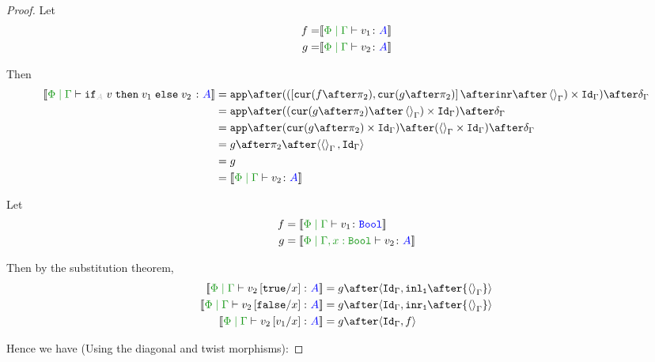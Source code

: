 \documentclass{report}
\begin{document}
\begin{framed}
\begin{proof}
        
        Let
        \begin{align*}
            f = &\deno{\gpetyperelation{v_1}{A}}\\
            g = &\deno{\gpetyperelation{v_2}{A}}\\
        \end{align*}
        
        Then
        \begin{equation}
            \begin{split}
                \deno{\gpetyperelation{\pifthenelse{A}{v}{v_1}{v_2}}{A}} & = \ifMorph{\inr\after\term{\G}}{f}{g} \\
                & = \app\after((\cur{g\after\pp}\after\term{\G})\times\idg)\after\diag{\G}\\
                & = \app\after(\cur{g\after\pp}\times\idg)\after(\term{\G}\times\idg)\after\diag{\G}\\
                & = g\after\pp\after\pr{\term{\G}}{\idg}\\
                & = g \\
                & = \deno{\gpetyperelation{v_2}{A}}\\
            \end{split}
        \end{equation}
        
            Let 
            \begin{align*}
                f & = \deno{\etyperelation{\P}{\G}{v_1}{\B}} \\
                g & = \deno{\etyperelation{\P}{\G, x: \B}{v_2}{A}} \\
            \end{align*}
        
        
            Then by the substitution theorem,
            \begin{align*}
                \deno{\etyperelation{\P}{\G}{v_2\ssub{x}{\t}}{A}} & = g\after\pr{\idg}{\inl_\1\after{\term{\G}}}\\
                \deno{\etyperelation{\P}{\G}{v_2\ssub{x}{\f}}{A}} & = g\after\pr{\idg}{\inr_\1\after{\term{\G}}}\\
                \deno{\gpetyperelation{v_2\ssub{x}{v_1}}{A}} & = g\after\pr{\idg}{f}
            \end{align*}
        
            Hence we have (Using the diagonal and twist morphisms):
         

\end{proof}
\end{framed}
\end{document}
